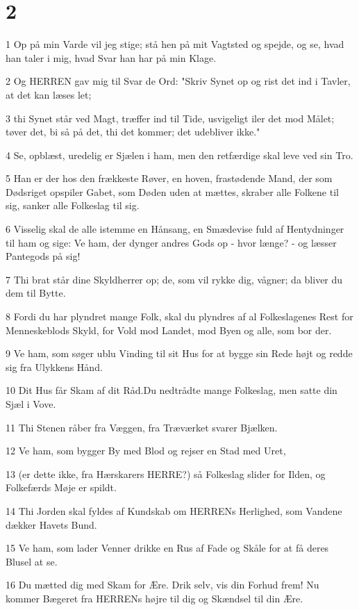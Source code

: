 \chapter{2}

\par 1 Op på min Varde vil jeg stige; stå hen på mit Vagtsted og spejde, og se, hvad han taler i mig, hvad Svar han har på min Klage.
\par 2 Og HERREN gav mig til Svar de Ord: "Skriv Synet op og rist det ind i Tavler, at det kan læses let;
\par 3 thi Synet står ved Magt, træffer ind til Tide, usvigeligt iler det mod Målet; tøver det, bi så på det, thi det kommer; det udebliver ikke."
\par 4 Se, opblæst, uredelig er Sjælen i ham, men den retfærdige skal leve ved sin Tro.
\par 5 Han er der hos den frækkeste Røver, en hoven, frastødende Mand, der som Dødsriget opspiler Gabet, som Døden uden at mættes, skraber alle Folkene til sig, sanker alle Folkeslag til sig.
\par 6 Visselig skal de alle istemme en Hånsang, en Smædevise fuld af Hentydninger til ham og sige: Ve ham, der dynger andres Gods op - hvor længe? - og læsser Pantegods på sig!
\par 7 Thi brat står dine Skyldherrer op; de, som vil rykke dig, vågner; da bliver du dem til Bytte.
\par 8 Fordi du har plyndret mange Folk, skal du plyndres af al Folkeslagenes Rest for Menneskeblods Skyld, for Vold mod Landet, mod Byen og alle, som bor der.
\par 9 Ve ham, som søger ublu Vinding til sit Hus for at bygge sin Rede højt og redde sig fra Ulykkens Hånd.
\par 10 Dit Hus får Skam af dit Råd.Du nedtrådte mange Folkeslag, men satte din Sjæl i Vove.
\par 11 Thi Stenen råber fra Væggen, fra Træværket svarer Bjælken.
\par 12 Ve ham, som bygger By med Blod og rejser en Stad med Uret,
\par 13 (er dette ikke, fra Hærskarers HERRE?) så Folkeslag slider for Ilden, og Folkefærds Møje er spildt.
\par 14 Thi Jorden skal fyldes af Kundskab om HERRENs Herlighed, som Vandene dækker Havets Bund.
\par 15 Ve ham, som lader Venner drikke en Rus af Fade og Skåle for at få deres Blusel at se.
\par 16 Du mætted dig med Skam for Ære. Drik selv, vis din Forhud frem! Nu kommer Bægeret fra HERRENs højre til dig og Skændsel til din Ære.
